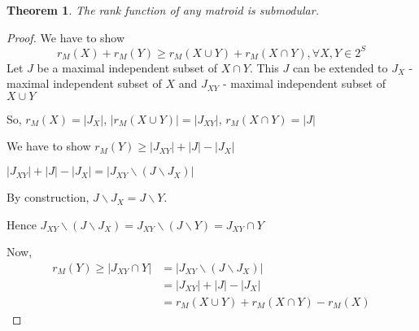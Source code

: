 \documentclass[options]{article}
\newtheorem{theorem}{Theorem}
\begin{document}
\begin{theorem}
The rank function of any matroid is submodular.
\end{theorem}

\begin{proof}
    We have to show
    \[
    r_M (X)+r_M (Y) \geq r_M (X \cup Y) + r_M (X \cap Y), \forall X,Y \in 2^S
    \]
    Let $J$ be a maximal independent subset of $ X \cap Y$. This $J$ can be extended to $J_X$ - maximal independent subset of $X$ and $J_{XY}$ -  maximal independent subset of $X \cup Y$ 
    
  So, $r_M(X) = |J_X|$, $|r_M(X \cup Y)| = |J_{XY}|$, $r_M(X \cap Y)= |J|$

We have to show $r_M(Y) \geq |J_{XY}|+|J|-|J_X|$

$|J_{XY}|+|J|-|J_X| = |J_{XY}\backslash (J \backslash J_X)| $

By construction,
$ J \backslash J_X = J \backslash Y$.

Hence $J_{XY}\backslash (J \backslash J_X) = J_{XY}\backslash (J \backslash Y) = J_{XY} \cap Y$

Now, 
\begin{align*}
r_M (Y) \geq |J_{XY} \cap Y| &= |J_{XY}\backslash (J \backslash J_X)| \\
 &=  |J_{XY}|+|J|-|J_X|\\
  &= r_M (X \cup Y) + r_M (X \cap Y)- r_M(X)  
\end{align*}
\end{proof}
\end{document}
